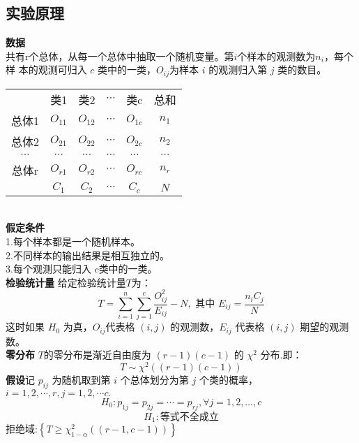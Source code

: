 \documentclass[a4paper, 11pt]{article}
\begin{document}
\subsection{实验原理}
\noindent \textbf{数据}\\
\indent 共有r个总体，从每一个总体中抽取一个随机变量。第$  i  $个样本的观测数为$ n_{i} $，每个样
本的观测可归入 $ c $ 类中的一类，$ O_{ij} $为样本 $ i $ 的观测归入第 $ j $ 类的数目。\\
\begin{table}[!h]
	\centering
	\begin{tabular}{cccccc}
		
		&类1&类2& $ \cdots $ &类c&总和\\
		\cline{2-5}
		\multicolumn{1}{c|}{总体1}&\multicolumn{1}{c|}{$ O_{11} $}&\multicolumn{1}{c|}{$ O_{12} $}&\multicolumn{1}{c|}{$\cdots $}&\multicolumn{1}{c|}{$ O_{1c} $}&$ n_{1} $\\
		\cline{2-5}
		\multicolumn{1}{c|}{总体2}&\multicolumn{1}{c|}{$ O_{21} $}&\multicolumn{1}{c|}{$ O_{22} $}&\multicolumn{1}{c|}{$\cdots $}&\multicolumn{1}{c|}{$ O_{2c} $}&$ n_{2} $\\
		\cline{2-5}
		\multicolumn{1}{c|}{$\cdots $}&\multicolumn{1}{c|}{$\cdots $}&\multicolumn{1}{c|}{$\cdots $}&\multicolumn{1}{c|}{$\cdots $}&\multicolumn{1}{c|}{$\cdots $}&$\cdots $\\
		\cline{2-5}
		\multicolumn{1}{c|}{总体r}&\multicolumn{1}{c|}{$ O_{r1} $}&\multicolumn{1}{c|}{$ O_{r2} $}&\multicolumn{1}{c|}{$\cdots $}&\multicolumn{1}{c|}{$ O_{rc} $}&$ n_{r} $\\
		\cline{2-5}
		&$ C_{1} $&$ C_{2} $&$\cdots$&$ C_{c} $&$ N $
	\end{tabular}
\end{table}\\
\textbf{假定条件}\\
\indent 1.每个样本都是一个随机样本。\\
\indent 2.不同样本的输出结果是相互独立的。\\
\indent 3.每个观测只能归入 $ c $类中的一类。\\
\textbf{检验统计量} \quad 给定检验统计量$ T $为：
$$T=\sum_{i=1}^{n} \sum_{j=1}^{c} \frac{O_{i j}^{2}}{E_{i j}}-N, \text { 其中 } E_{i j}=\frac{n_{i} C_{j}}{N}$$
这时如果 $H_{0}$ 为真，$ O_{ij} $代表格 $(i, j)$ 的观测数，$ E_{ij} $ 代表格 $(i, j)$ 期望的观测数。\\
\textbf{零分布} \quad
$T$的零分布是渐近自由度为 $(r-1)(c-1)$ 的 $\chi^{2}$ 分布.即：
$$T \sim \chi^{2}((r-1)(c-1))$$
\textbf{假设}\quad 记 $p_{ij}$ 为随机取到第 $i$ 个总体划分为第 $j$ 个类的概率， $i=1,2, \cdots, r, j=1,2, \cdots c .$
$$H_{0}: p_{1 j}=p_{2 j}=\cdots=p_{r j}, \forall j=1,2, \ldots, c$$
$$H_{1}: \text{等式不全成立}$$
拒绝域:$\left\{T \geq \chi_{1-\alpha}^{2}((r-1, c-1))\right\}$
\end{document}
